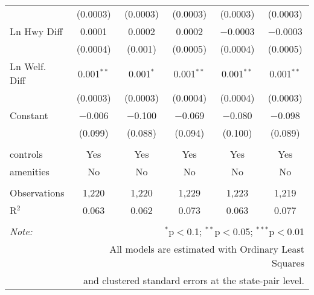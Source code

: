 \begin{table}[!htbp]
\begin{tabular}{@{\extracolsep{5pt}}lccccc}
  & (0.0003) & (0.0003) & (0.0003) & (0.0003) & (0.0003) \\ 
  Ln Hwy Diff & 0.0001 & 0.0002 & 0.0002 & $-$0.0003 & $-$0.0003 \\ 
  & (0.0004) & (0.001) & (0.0005) & (0.0004) & (0.0005) \\ 
  Ln Welf. Diff & 0.001$^{**}$ & 0.001$^{*}$ & 0.001$^{**}$ & 0.001$^{**}$ & 0.001$^{**}$ \\ 
  & (0.0003) & (0.0003) & (0.0004) & (0.0004) & (0.0003) \\ 
  Constant & $-$0.006 & $-$0.100 & $-$0.069 & $-$0.080 & $-$0.098 \\ 
  & (0.099) & (0.088) & (0.094) & (0.100) & (0.089) \\ 
 \hline \\[-1.8ex] 
controls & Yes & Yes & Yes & Yes & Yes \\ 
amenities & No & No & No & No & No \\ 
\hline \\[-1.8ex] 
Observations & 1,220 & 1,220 & 1,229 & 1,223 & 1,219 \\ 
R$^{2}$ & 0.063 & 0.062 & 0.073 & 0.063 & 0.077 \\ 
\hline 
\hline \\[-1.8ex] 
\textit{Note:}  & \multicolumn{5}{r}{$^{*}$p$<$0.1; $^{**}$p$<$0.05; $^{***}$p$<$0.01} \\ 
 & \multicolumn{5}{r}{All models are estimated with Ordinary Least Squares} \\ 
 & \multicolumn{5}{r}{and clustered standard errors at the state-pair level.} \\ 
\end{tabular} 
\end{table} 
